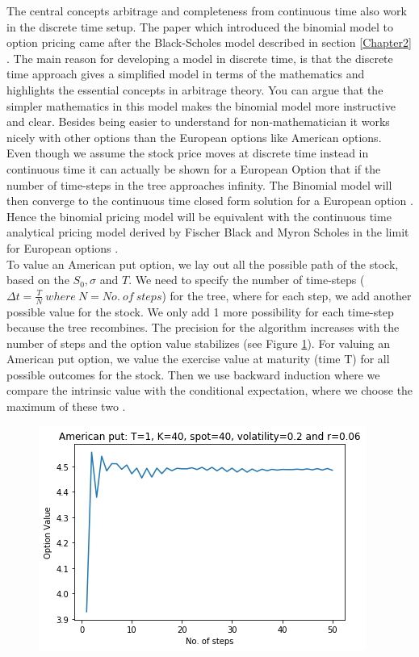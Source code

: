 The central concepts arbitrage and completeness from continuous time also work in the discrete time setup. The paper \parencite{CRR} which introduced the binomial model to option pricing came after the Black-Scholes model described in section \ref{Chapter2} \parencite{B-S-Paper}. The main reason for developing a model in discrete time, is that the discrete time approach gives a simplified model in terms of the mathematics and highlights the essential concepts in arbitrage theory. You can argue that the simpler mathematics in this model makes the binomial model more instructive and clear. Besides being easier to understand for non-mathematician it works nicely with other options than the European options like American options.\\

Even though we assume the stock price moves at discrete time instead in continuous time it can actually be shown for a European Option that if the number of time-steps in the tree approaches infinity. The Binomial model will then converge to the continuous time closed form solution for a European option \parencite{CRR} \parencite{Hull}. Hence the binomial pricing model will be equivalent with the continuous time analytical pricing model derived by Fischer Black and Myron Scholes in the limit for European options \parencite{CRR}.\\

To value an American put option, we lay out all the possible path of the stock, based on the $S_0,\sigma$ and $T$. We need to specify the number of time-steps ($\Delta t = \frac{T}{N} \ where \ N=No. \ of  \ steps$) for the tree, where for each step, we add another possible value for the stock. We only add 1 more possibility for each time-step because the tree recombines. The precision for the algorithm increases with the number of steps and the option value stabilizes (see Figure \ref{fig:binConv}). For valuing an American put option, we value the exercise value at maturity (time T) for all possible outcomes for the stock. Then we use backward induction where we compare the intrinsic value with the conditional expectation, where we choose the maximum of these two \parencite{Hull}. 
 
\begin{figure}[th]
\centering
\includegraphics{Figures/binConv.png}
\decoRule
\caption[Convergence of Binomial model]{}
\label{fig:binConv}
\end{figure}

